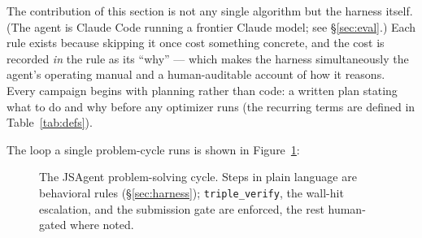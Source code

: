 \documentclass[11pt]{article}
\newcommand{\src}[1]{}
\begin{document}
The contribution of this section is not any single algorithm but the harness itself. (The
agent is Claude Code running a frontier Claude model; see \S\ref{sec:eval}.) Each rule exists
because skipping it once cost something concrete, and the cost is recorded \emph{in} the rule
as its ``why'' --- which makes the harness simultaneously the agent's operating manual and a
human-auditable account of how it reasons. Every campaign begins with planning rather than
code: a written plan stating what to do and why before any optimizer runs (the recurring
terms are defined in Table~\ref{tab:defs}).
\src{.claude/rules/, docs/agent/}

The loop a single problem-cycle runs is shown in Figure~\ref{fig:loop}:

\begin{figure}[h]
\centering
{}
\caption{The JSAgent problem-solving cycle. Steps in plain language are behavioral rules
(\S\ref{sec:harness}); \texttt{triple\_verify}, the wall-hit escalation, and the submission
gate are enforced, the rest human-gated where noted.}
\label{fig:loop}
\end{figure}
\end{document}
